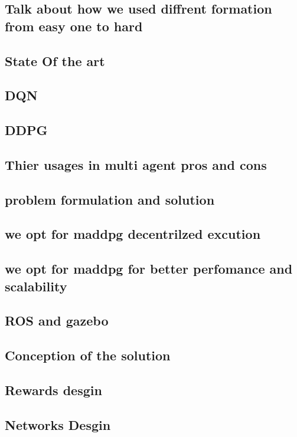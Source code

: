 \documentclass[12pt]{extarticle}
\begin{document}
 
   



\subsection{Talk about how we used diffrent formation from easy one to hard}








\subsection{State Of the art}
\subsection{DQN}
\subsection{DDPG}
\subsection{Thier usages in multi agent pros and cons}
\subsection{problem formulation and solution}
\subsection{we opt for maddpg decentrilzed excution }
\subsection{we opt for maddpg for better perfomance and scalability }


\subsection{ROS and gazebo}


\subsection{Conception of the solution}
  \subsection{Rewards desgin}
  \subsection{Networks Desgin}
\end{document}
